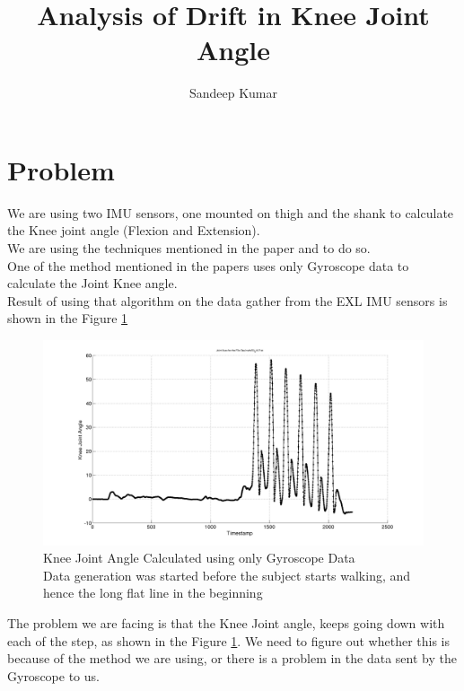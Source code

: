 \documentclass[12pt]{article}
\title{Analysis of Drift in Knee Joint Angle}
\author{Sandeep Kumar}
\begin{document}
\maketitle


\section*{Problem}

We are using two IMU sensors, one mounted on thigh and the shank to calculate the Knee joint angle (Flexion and Extension).\\
We are using the techniques mentioned in the paper \cite{s140406891} and \cite{conf/IEEEcca/SeelSR12} to do so.\\

One of the method mentioned in the papers uses only Gyroscope data to calculate the Joint Knee angle.\\

Result of using that algorithm on the data gather from the EXL IMU sensors is shown in the Figure \ref{exlgyrosangle}

\begin{figure}[!htb]
\includegraphics[scale=.32,left]{problem.png}
\caption{Knee Joint Angle Calculated using only Gyroscope Data\\
\scriptsize{Data generation was started before the subject starts walking, and hence the long flat line in the beginning }
}
\label{exlgyrosangle}
\end{figure}

The problem we are facing is that the Knee Joint angle, keeps going down with each of the step, as shown in the Figure \ref{exlgyrosangle}. We need to figure out whether this is because of the method we are using, or there is a problem in the data sent by the Gyroscope to us.
\end{document}
